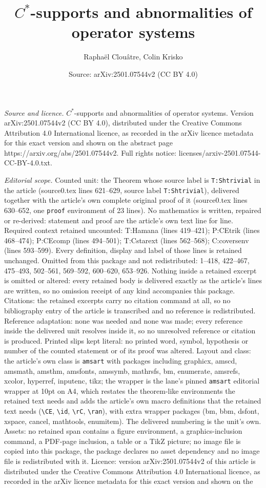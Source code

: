 \documentclass[10pt,a4paper]{amsart}
\title[$C^*$-supports and abnormalities of operator systems]{$C^*$-supports and abnormalities of operator systems}
\author{Rapha\"el Clou\^atre, Colin Krisko}
\date{Source: arXiv:2501.07544v2 (CC BY 4.0)}
\begin{document}
\maketitle

\noindent\emph{Source and licence.} $C^*$-supports and abnormalities of operator systems. Version arXiv:2501.07544v2 (CC BY 4.0), distributed under the Creative Commons Attribution 4.0 International licence, as recorded in the arXiv licence metadata for this exact version and shown on the abstract page https://arxiv.org/abs/2501.07544v2. Full rights notice: licenses/arxiv-2501.07544-CC-BY-4.0.txt.\par\smallskip

\noindent\textit{Editorial scope.} Counted unit: the Theorem whose source label is \texttt{T:Shtrivial} in the article (source0.tex lines 621--629, source label \texttt{T:Shtrivial}), delivered together with the article's own complete original proof of it (source0.tex lines 630--652, one \texttt{proof} environment of 23 lines). No mathematics is written, repaired or re-derived: statement and proof are the article's own text line for line. Required context retained uncounted: T:Hamana (lines 419--421); P:CEtrik (lines 468--474); P:CEcomp (lines 494--501); T:Cstarext (lines 562--568); C:coversenv (lines 593--599). Every definition, display and label of those lines is retained unchanged. Omitted from this package and not redistributed: 1--418, 422--467, 475--493, 502--561, 569--592, 600--620, 653--926. Nothing inside a retained excerpt is omitted or altered: every retained body is delivered exactly as the article's lines are written, so no omission receipt of any kind accompanies this package. Citations: the retained excerpts carry no citation command at all, so no bibliography entry of the article is transcribed and no reference is redistributed. Reference adaptation: none was needed and none was made; every reference inside the delivered unit resolves inside it, so no unresolved reference or citation is produced. Printed slips kept literal: no printed word, symbol, hypothesis or number of the counted statement or of its proof was altered. Layout and class: the article's own class is \texttt{amsart} with packages including graphicx, amscd, amsmath, amsthm, amsfonts, amssymb, mathrsfs, bm, enumerate, amsrefs, xcolor, hyperref, inputenc, tikz; the wrapper is the lane's pinned \texttt{amsart} editorial wrapper at 10pt on A4, which restates the theorem-like environments the retained text needs and adds the article's own macro definitions that the retained text needs (\texttt{\textbackslash CE}, \texttt{\textbackslash id}, \texttt{\textbackslash rC}, \texttt{\textbackslash ran}), with extra wrapper packages (bm, bbm, dsfont, xspace, cancel, mathtools, enumitem). The delivered numbering is the unit's own. Assets: no retained span contains a figure environment, a graphics-inclusion command, a PDF-page inclusion, a table or a TikZ picture; no image file is copied into this package, the package declares no asset dependency and no image file is redistributed with it. Licence: version arXiv:2501.07544v2 of this article is distributed under the Creative Commons Attribution 4.0 International licence, as recorded in the arXiv licence metadata for this exact version and shown on the 
\end{document}
